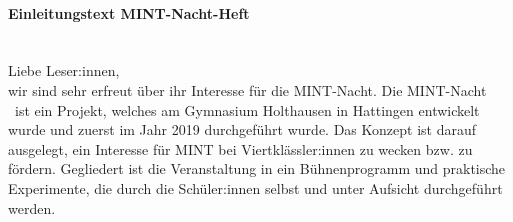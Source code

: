 \documentclass[12pt,a4paper]{report}
\newcommand{\gen}[0]{:innen }
\newcommand{\gens}[0]{:innen}
\newcommand{\mn}[0]{MINT-Nacht }
\newcommand{\mns}[0]{MINT-Nacht}
\begin{document}
	\noindent
	\large
	\paragraph{Einleitungstext MINT-Nacht-Heft} \mbox{} \\[0.5cm]
	Liebe Leser\gens, \\
	wir sind sehr erfreut über ihr Interesse für die \mns.
	Die \mn\ ist ein Projekt, welches am Gymnasium Holthausen in Hattingen entwickelt wurde und zuerst im Jahr 2019 durchgeführt wurde.
	Das Konzept ist darauf ausgelegt, ein Interesse für MINT bei Viertklässler\gen zu wecken bzw. zu fördern.
	Gegliedert ist die Veranstaltung in ein Bühnenprogramm und praktische Experimente, die durch die Schüler\gen selbst und unter Aufsicht durchgeführt werden.
	
	
\end{document}
